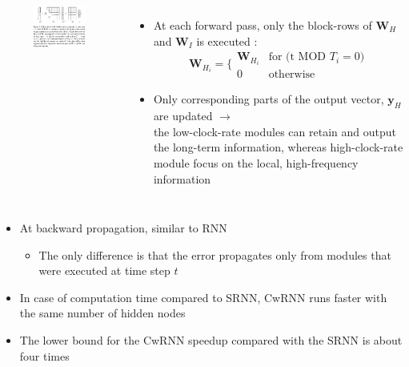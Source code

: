 \documentclass{beamer}
\begin{document}
\frame
{
	\begin{columns}
	\begin{figure}[ht]  
		\begin{center}
			\includegraphics[width=2.1in]{Images/cwrnn_calculation.png}   
		\end{center}   
	\end{figure}							
	\begin{itemize}
		\item At each forward pass, only the block-rows of ${\mathbf{W}_H}$ and ${\mathbf{W}_I}$ is executed : 
	\[
	\mathbf{W}_{H_i}= \{
	  \begin{array}{ll}
	    \mathbf{W}_{H_i} & \text{for (t MOD ${T_i = 0}$)}\\
	    0 &	\text{otherwise}    
	  \end{array}
	\]
	\item Only corresponding parts of the output vector, ${\mathbf{y}_H}$ are updated ${\rightarrow}$ \\
	the low-clock-rate modules can retain and output the long-term information, whereas high-clock-rate module focus on the local, high-frequency information
	\end{itemize}		
	\end{columns}
}
\frame
{
	\begin{itemize}
		\item At backward propagation, similar to RNN		
		\begin{itemize}
			\item The only difference is that the error propagates only from modules that were executed at time step ${t}$
		\end{itemize}
		\item In case of computation time compared to SRNN, CwRNN runs faster with the same number of hidden nodes 
		\item The lower bound for the CwRNN speedup compared with the SRNN is about four times		
	\end{itemize}		
}
\frame
\end{document}
